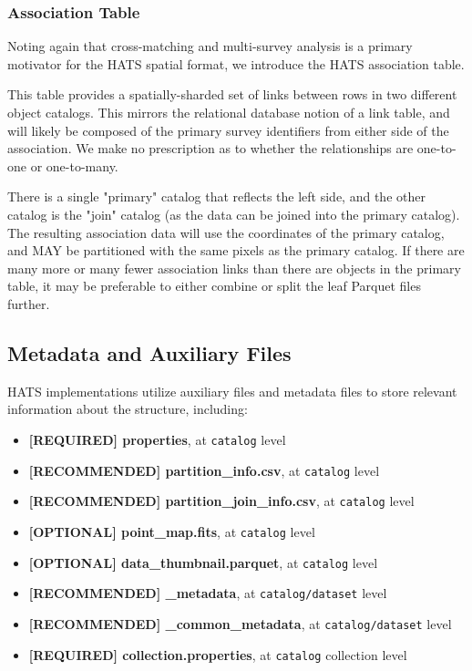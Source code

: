 \documentclass[11pt,a4paper]{ivoa}
\begin{document}
\subsubsection{Association Table} \label{sec:association}

Noting again that cross-matching and multi-survey analysis is a primary motivator for the HATS spatial format, we introduce the HATS association table. 

This table provides a spatially-sharded set of links between rows in two different object catalogs. 
This mirrors the relational database notion of a link table, and will likely be composed of the primary survey identifiers from either side of the association.
We make no prescription as to whether the relationships are one-to-one or one-to-many. \par

There is a single "primary" catalog that reflects the left side, and the other catalog is the "join" catalog (as the data can be joined into the primary catalog).
The resulting association data will use the coordinates of the primary catalog, and MAY be partitioned with the same pixels as the primary catalog.
If there are many more or many fewer association links than there are objects in the primary table, it may be preferable to either combine or split the leaf Parquet files further.


\subsection{Metadata and Auxiliary Files} \label{sec:meta}
HATS implementations utilize auxiliary files and metadata files to store relevant information about the  structure, including:
\begin{itemize}
    \item \textbf{[REQUIRED] properties}, at  \texttt{catalog} level    
    \item \textbf{[RECOMMENDED] partition\_info.csv}, at  \texttt{catalog} level
    \item \textbf{[RECOMMENDED] partition\_join\_info.csv}, at  \texttt{catalog} level
    \item \textbf{[OPTIONAL] point\_map.fits}, at  \texttt{catalog} level
    \item \textbf{[OPTIONAL] data\_thumbnail.parquet}, at  \texttt{catalog} level
    \item \textbf{[RECOMMENDED] \_metadata}, at  \texttt{catalog/dataset} level
    \item \textbf{[RECOMMENDED] \_common\_metadata}, at  \texttt{catalog/dataset} level
    \item \textbf{[REQUIRED] collection.properties}, at  \texttt{catalog} collection level
\end{itemize}
    
\end{document}

